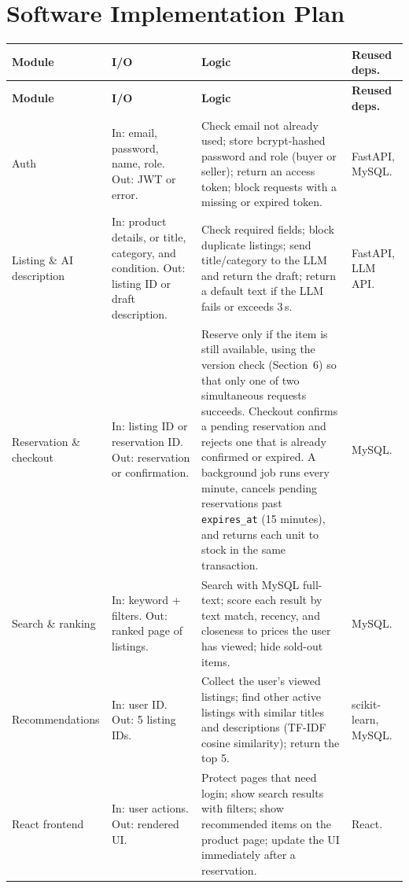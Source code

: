 \documentclass[11pt]{article}
\begin{document}
\section{Software Implementation Plan}
{\small
\begin{xltabular}{\linewidth}{@{}P{2.75cm}P{3.0cm}LP{2.3cm}@{}}
\toprule
\textbf{Module} & \textbf{I/O} & \textbf{Logic} & \textbf{Reused deps.} \\
\midrule
\endfirsthead
\toprule
\textbf{Module} & \textbf{I/O} & \textbf{Logic} & \textbf{Reused deps.} \\
\midrule
\endhead
Auth & In: email, password, name, role. Out: JWT or error. &
Check email not already used; store bcrypt-hashed password and role (buyer or seller); return an access token; block requests with a missing or expired token. & FastAPI, MySQL. \\
Listing \& AI description & In: product details, or title, category, and condition. Out: listing ID or draft description. &
Check required fields; block duplicate listings; send title/category to the LLM and return the draft; return a default text if the LLM fails or exceeds 3\,s. & FastAPI, LLM API. \\
Reservation \& checkout & In: listing ID or reservation ID. Out: reservation or confirmation. &
Reserve only if the item is still available, using the version check (Section~6) so that only one of two simultaneous requests succeeds. Checkout confirms a pending reservation and rejects one that is already confirmed or expired. A background job runs every minute, cancels pending reservations past \texttt{expires\_at} (15 minutes), and returns each unit to stock in the same transaction. & MySQL. \\
Search \& ranking & In: keyword + filters. Out: ranked page of listings. &
Search with MySQL full-text; score each result by text match, recency, and closeness to prices the user has viewed; hide sold-out items. & MySQL. \\
Recommendations & In: user ID. Out: 5 listing IDs. &
Collect the user's viewed listings; find other active listings with similar titles and descriptions (TF-IDF cosine similarity); return the top 5. & scikit-learn, MySQL. \\
React frontend & In: user actions. Out: rendered UI. &
Protect pages that need login; show search results with filters; show recommended items on the product page; update the UI immediately after a reservation. & React. \\
\bottomrule
\end{xltabular}}
\end{document}
